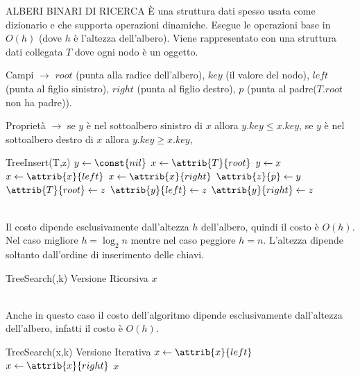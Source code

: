 \documentclass[8pt]{extarticle}
\begin{document}
\begin{formulario}
		\begin{myParagraph}{ALBERI BINARI DI RICERCA}
È una struttura dati spesso usata come dizionario e che supporta operazioni dinamiche. Esegue le operazioni base in $O(h)$ (dove $h$ è l'altezza dell'albero). Viene rappresentato con una struttura dati collegata $T$ dove ogni nodo è un oggetto.
			\begin{descr}{0}
				\item[Campi] $\rightarrow$
					$root$ (punta alla radice dell'albero),
					$key$ (il valore del nodo),
					$left$ (punta al figlio sinistro),
					$right$ (punta al figlio destro),
					$p$ (punta al padre($T.root$ non ha padre)).
				\item[Proprietà] $\rightarrow$
					se $y$ è nel sottoalbero sinistro di $x$ allora $y.key\leq x.key$,
					se $y$ è nel sottoalbero destro di $x$ allora $y.key\geq x.key$,
			\end{descr}
			\begin{code}{TreeInsert(T,z)}
\li $y\la\const{nil}$ 
\li $x\la\attrib{T}{root}$
\li {}
	\li $y\leftarrow x$
	\li {}
		\li $x\la\attrib{x}{left}$
	\li \ELSE $x\la\attrib{x}{right}$
	\End
\End
\li $\attrib{z}{p}\la y$
\li {}
	\li $\attrib{T}{root}\la z$ 
\li {}
	\li $\attrib{y}{left}\la z$
\li \ELSE $\attrib{y}{right}\la z$
			\end{code}
\\
Il costo dipende esclusivamente dall'altezza $h$ dell'albero, quindi il costo è $O(h)$. Nel caso migliore $h=\log_2 n$ mentre nel caso peggiore $h=n$. L'altezza dipende soltanto dall'ordine di inserimento delle chiavi.

			\begin{code}{TreeSearch(,k) \qquad Versione Ricorsiva}
\li {}
	\li \RETURN $x$
\END
\li {}
	\li \RETURN {}
	\li \ELSE \RETURN {}
\END
			\end{code}
\\
Anche in questo caso il costo dell'algoritmo dipende esclusivamente dall'altezza dell'albero, infatti il costo è $O(h)$.
			
			\begin{code}{TreeSearch(x,k) \qquad Versione Iterativa}
\li {}
	\li {}
		\li $x\la\attrib{x}{left}$
	\li \ELSE $x\la\attrib{x}{right}$
	\END
\END
\li \RETURN $x$
			\end{code}
			

\end{myParagraph}
\end{formulario}
\end{document}
